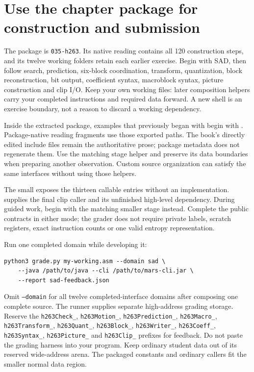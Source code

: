 \section{Use the chapter package for construction and submission}
The package is \texttt{035-h263}. Its native reading contains all 120 construction
steps, and its twelve working folders retain each earlier exercise. Begin with
SAD, then follow search, prediction, six-block coordination, transform,
quantization, block reconstruction, bit output, coefficient syntax, macroblock
syntax, picture construction and clip I/O. Keep your own working files: later
composition helpers carry your completed instructions and required data forward.
A new shell is an exercise boundary, not a reason to discard a working dependency.

Inside the extracted package, examples that previously began with
 begin with . Package-native reading fragments
use those exported paths. The book's directly edited include files remain the
authoritative prose; package metadata does not regenerate them. Use the matching
stage helper and preserve its data boundaries when preparing another observation.
Custom source organization can satisfy the same interfaces without using those
helpers.

The small  exposes the thirteen callable entries
without an implementation.  supplies the final clip caller
and its unfinished high-level dependency. During guided work, begin with the
matching smaller stage instead. Complete the public contracts in either mode;
the grader does not require private labels, scratch registers, exact instruction
counts or one valid entropy representation.

Run one completed domain while developing it:
\begin{verbatim}
python3 grade.py my-working.asm --domain sad \
    --java /path/to/java --cli /path/to/mars-cli.jar \
    --report sad-feedback.json
\end{verbatim}
Omit \texttt{--domain} for all twelve completed-interface domains after composing
one complete source. The runner supplies separate high-address grading storage.
Reserve the \texttt{h263Check\_}, \texttt{h263Motion\_},
\texttt{h263Prediction\_}, \texttt{h263Macro\_}, \texttt{h263Transform\_},
\texttt{h263Quant\_}, \texttt{h263Block\_}, \texttt{h263Writer\_},
\texttt{h263Coeff\_}, \texttt{h263Syntax\_}, \texttt{h263Picture\_} and
\texttt{h263Clip\_} prefixes for feedback. Do not paste the grading harness into
your program. Keep ordinary student data out of its reserved wide-address arena.
The packaged constants and ordinary callers fit the smaller normal data region.

